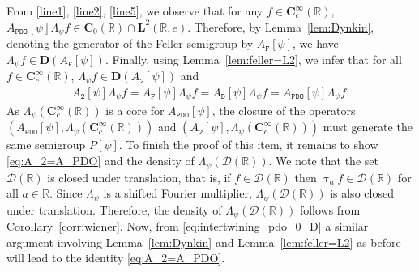 \documentclass[12pt]{amsart}
\newcommand{\hptg}[2]{\hypertarget{#1}{#2}}
\numberwithin{equation}{section}
\newcommand{\bb}{\mathbb}
\newcommand{\cc}{\mathcal}
\newcommand{\ttt}{\mathtt}
\newcommand{\bmrm}[2][2]{\mathbf{#2}^{#1}}
\newcommand{\C}{\mathbf{C}}
\newcommand{\D}{\mathbf{D}}
\newcommand{\cD}{\mathcal{D}}
\theoremstyle{definition}
\theoremstyle{assump}
\theoremstyle{remark}
\begin{document}
{From \eqref{line1}, \eqref{line2}, \eqref{line5}, we observe that for any $ f \in \C^\infty_c(\bb{R})$, $A_\ttt{PDO}[\psi]\Lambda_\psi f \in \C_0(\bb{R})\cap\bmrm{L}(\bb{R},e)$. Therefore, by Lemma~\ref{lem:Dynkin}, denoting the generator of the Feller semigroup by $A_\ttt{F}[\psi]$, we have $\Lambda_\psi f \in\D(A_\ttt{F}[\psi])$. Finally, using Lemma~\ref{lem:feller=L2}, we infer that for all $f\in \C^\infty_c(\bb{R})$, $\Lambda_\psi f \in\D(A_\ttt{2}[\psi])$ and
\begin{align*}
A_\ttt{2}[\psi]\Lambda_\psi f =A_\ttt{F}[\psi]\Lambda_\psi f =A_\ttt{D}[\psi]\Lambda_\psi f =A_\ttt{PDO}[\psi]\Lambda_\psi f .
\end{align*}
As $\Lambda_\psi(\C^\infty_c(\bb{R}))$ is a core for $A_\ttt{PDO}[\psi]$, the \hptg{C48}{closure of the operators $(A_{\ttt{PDO}}[\psi],\Lambda_\psi(\C^\infty_c(\bb{R})))$ and $(A_\ttt{2}[\psi],\Lambda_\psi(\C^\infty_c(\bb{R})))$ must generate the same semigroup $P[\psi]$}. To finish the proof of this item, it remains to show \eqref{eq:A_2=A_PDO} and the density of $\Lambda_\psi(\cD(\bb R))$. We note that the set $\cc{D}(\bb R)$ is closed under translation, that is, if $f\in\cc{D}(\bb R)$ then $\uptau_a f\in\cc{D}(\bb R)$ for all $a\in\bb R$. Since $\Lambda_\psi$ is a shifted Fourier multiplier, $\Lambda_\psi(\cD(\bb R))$ is also closed under translation. Therefore, the density of $\Lambda_\psi(\cD(\bb R))$ follows from Corollary~\ref{corr:wiener}. Now, from \eqref{eq:intertwining_pdo_0_D} a similar argument involving Lemma~\ref{lem:Dynkin} and Lemma~\ref{lem:feller=L2} as before will lead to the identity \eqref{eq:A_2=A_PDO}.



}
\end{document}
